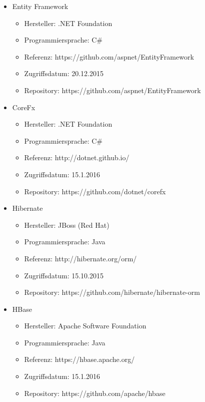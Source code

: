 \begin{itemize}
\begin{itemize}
		\end{itemize}
	\item Entity Framework 
		\begin{itemize}
			\item Hersteller: .NET Foundation
			\item Programmiersprache: C\#
			\item Referenz: https://github.com/aspnet/EntityFramework
			\item Zugriffsdatum: 20.12.2015
			\item Repository: https://github.com/aspnet/EntityFramework
		\end{itemize}
	\item CoreFx
		\begin{itemize}
			\item Hersteller: .NET Foundation
			\item Programmiersprache: C\#
			\item Referenz: http://dotnet.github.io/
			\item Zugriffsdatum: 15.1.2016
			\item Repository: https://github.com/dotnet/corefx
		\end{itemize}
	\item Hibernate
		\begin{itemize}
			\item Hersteller: JBoss (Red Hat)
			\item Programmiersprache: Java
			\item Referenz: http://hibernate.org/orm/
			\item Zugriffsdatum: 15.10.2015
			\item Repository: https://github.com/hibernate/hibernate-orm
		\end{itemize}
	\item HBase 
		\begin{itemize}
			\item Hersteller: Apache Software Foundation
			\item Programmiersprache: Java
			\item Referenz: https://hbase.apache.org/
			\item Zugriffsdatum: 15.1.2016
			\item Repository: https://github.com/apache/hbase
		\end{itemize}
\end{itemize}
